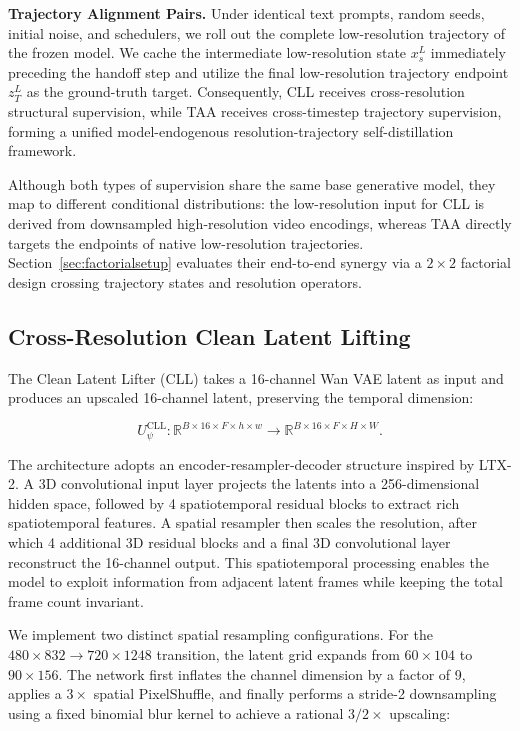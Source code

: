\textbf{Trajectory Alignment Pairs.} Under identical text prompts,
random seeds, initial noise, and schedulers, we roll out the complete
low-resolution trajectory of the frozen model. We cache the intermediate
low-resolution state \(x_s^L\) immediately preceding the handoff step
and utilize the final low-resolution trajectory endpoint \(z_T^L\) as
the ground-truth target. Consequently, CLL receives cross-resolution
structural supervision, while TAA receives cross-timestep trajectory
supervision, forming a unified model-endogenous resolution-trajectory
self-distillation framework.

Although both types of supervision share the same base generative model,
they map to different conditional distributions: the low-resolution
input for CLL is derived from downsampled high-resolution video
encodings, whereas TAA directly targets the endpoints of native
low-resolution trajectories. Section~\ref{sec:factorialsetup} evaluates their end-to-end
synergy via a \(2\times2\) factorial design crossing trajectory states
and resolution operators.

\subsection{Cross-Resolution Clean Latent Lifting}

The Clean Latent Lifter (CLL) takes a 16-channel Wan VAE latent as input
and produces an upscaled 16-channel latent, preserving the temporal
dimension:

\[
U_\psi^{\mathrm{CLL}}:\mathbb{R}^{B\times16\times F\times h\times w}
\rightarrow \mathbb{R}^{B\times16\times F\times H\times W}.
\]

The architecture adopts an encoder-resampler-decoder structure inspired
by LTX-2. A 3D convolutional input layer projects the latents into a
256-dimensional hidden space, followed by 4 spatiotemporal residual
blocks to extract rich spatiotemporal features. A spatial resampler then
scales the resolution, after which 4 additional 3D residual blocks and a
final 3D convolutional layer reconstruct the 16-channel output. This
spatiotemporal processing enables the model to exploit information from
adjacent latent frames while keeping the total frame count invariant.

We implement two distinct spatial resampling configurations. For the
\(480\times832 \rightarrow 720\times1248\) transition, the latent grid
expands from \(60\times104\) to \(90\times156\). The network first
inflates the channel dimension by a factor of 9, applies a \(3\times\)
spatial PixelShuffle, and finally performs a stride-2 downsampling using
a fixed binomial blur kernel to achieve a rational \(3/2\times\)
upscaling:

